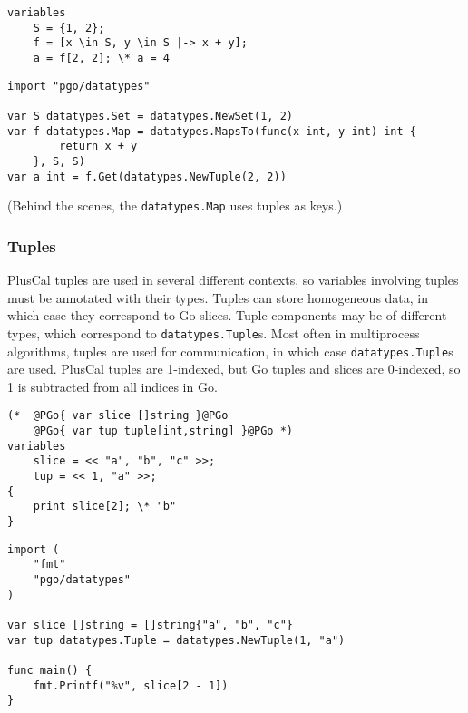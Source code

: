 \noindent
\begin{minipage}[t]{\textwidth}
\begin{lstlisting}[language=pcal]
variables
	S = {1, 2};
	f = [x \in S, y \in S |-> x + y];
	a = f[2, 2]; \* a = 4
\end{lstlisting}
\end{minipage}

\noindent
\begin{minipage}[t]{\textwidth}
\begin{lstlisting}[language=golang]
import "pgo/datatypes"

var S datatypes.Set = datatypes.NewSet(1, 2)
var f datatypes.Map = datatypes.MapsTo(func(x int, y int) int {
		return x + y
	}, S, S)
var a int = f.Get(datatypes.NewTuple(2, 2))
\end{lstlisting}
\end{minipage}

(Behind the scenes, the \texttt{datatypes.Map} uses tuples as keys.)

\subsubsection{Tuples}
PlusCal tuples are used in several different contexts, so variables involving tuples must be annotated with their types. Tuples can store homogeneous data, in which case they correspond to Go slices. Tuple components may be of different types, which correspond to \texttt{datatypes.Tuple}s. Most often in multiprocess algorithms, tuples are used for communication, in which case \texttt{datatypes.Tuple}s are used. PlusCal tuples are 1-indexed, but Go tuples and slices are 0-indexed, so 1 is subtracted from all indices in Go.

\noindent
\begin{minipage}[t]{\textwidth}
\begin{lstlisting}[language=pcal]
(*	@PGo{ var slice []string }@PGo
	@PGo{ var tup tuple[int,string] }@PGo *)
variables
	slice = << "a", "b", "c" >>;
	tup = << 1, "a" >>;
{
	print slice[2]; \* "b"
}
\end{lstlisting}
\end{minipage}

\noindent
\begin{minipage}[t]{\textwidth}
\begin{lstlisting}[language=golang]
import (
	"fmt"
	"pgo/datatypes"
)

var slice []string = []string{"a", "b", "c"}
var tup datatypes.Tuple = datatypes.NewTuple(1, "a")

func main() {
	fmt.Printf("%v", slice[2 - 1])
}
\end{lstlisting}
\end{minipage}

